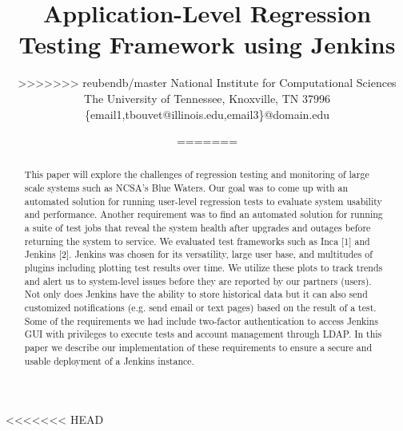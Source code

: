 \documentclass[10pt, conference, compsocconf]{IEEEtran}
\begin{document}
\title{Application-Level Regression Testing Framework using Jenkins}





%
<<<<<<< HEAD
\author{
=======
\author{
>>>>>>> reubendb/master
National Institute for Computational Sciences\\
The University of Tennessee, Knoxville, TN 37996\\
\{email1,tbouvet@illinois.edu,email3\}@domain.edu}





\maketitle
\thispagestyle{plain}

\begin{abstract}
This paper will explore the challenges of regression testing and monitoring of large scale systems such as NCSA’s Blue Waters. Our goal was to come up with an automated solution for running user-level regression tests to evaluate system usability and performance. Another requirement was to find an automated solution for running a suite of test jobs that reveal the system health after upgrades and outages before returning the system to service. We evaluated test frameworks such as Inca [1] and Jenkins [2]. Jenkins was chosen for its versatility, large user base, and multitudes of plugins including plotting test results over time. We utilize these plots to track trends and alert us to system-level issues before they are reported by our partners (users). Not only does Jenkins have the ability to store historical data but it can also send customized notifications (e.g. send email or text pages) based on the result of a test. Some of the requirements we had include two-factor authentication to access Jenkins GUI with privileges to execute tests and account management through LDAP. In this paper we describe our implementation of these requirements to ensure a secure and usable deployment of a Jenkins instance.


\end{abstract}}
\end{document}
